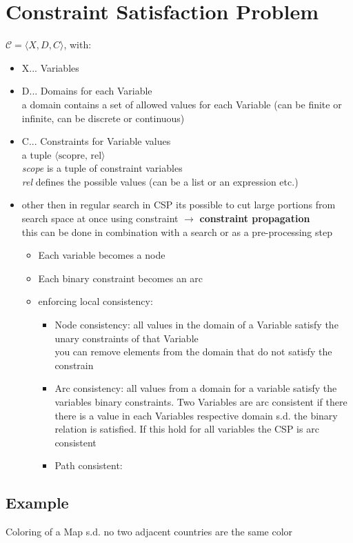 \documentclass[12pt,a4paper]{article}
\begin{document}
\section{Constraint Satisfaction Problem}
$\mathcal{C} = \langle X,D,C \rangle$, with:
\begin{itemize}
\item X... Variables
\item D... Domains for each Variable\\
a domain contains a set of allowed values for each Variable (can be finite or infinite, can be discrete or continuous)
\item C... Constraints for Variable values\\
a tuple $\langle \text{scopre, rel} \rangle$\\
\textit{scope} is a tuple of constraint variables\\
\textit{rel} defines the possible values (can be a list or an expression etc.)
\item other then in regular search in CSP its possible to cut large portions from search space at once using constraint $\rightarrow$ \textbf{constraint propagation}\\
this can be done in combination with a search or as a pre-processing step
\begin{itemize}
\item Each variable becomes a node
\item Each binary constraint becomes an arc
\item enforcing local consistency:
\begin{itemize}
\item Node consistency: all values in the domain of a Variable satisfy the unary constraints of that Variable\\
you can remove elements from the domain that do not satisfy the constrain
\item Arc consistency: all values from a domain for a variable satisfy the variables binary constraints. Two Variables are arc consistent if there there is a value in each Variables respective domain s.d. the binary relation is satisfied. If this hold for all variables the CSP is arc consistent
\item Path consistent: 
\end{itemize}
\end{itemize}
\end{itemize}


\subsection{Example}
Coloring of a Map s.d. no two adjacent countries are the same color
\end{document}
